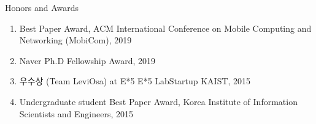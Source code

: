 
\begin{rSection}{Honors and Awards}
  \begin{enumerate}
  \item Best Paper Award, ACM International Conference on Mobile Computing and Networking (MobiCom), 2019
  \item Naver Ph.D Fellowship Award, 2019
  \item 우수상 (Team LeviOsa) at E*5 E*5 LabStartup KAIST, 2015
  \item Undergraduate student Best Paper Award, Korea Institute of Information Scientists and Engineers, 2015
  \end{enumerate}
\end{rSection}
